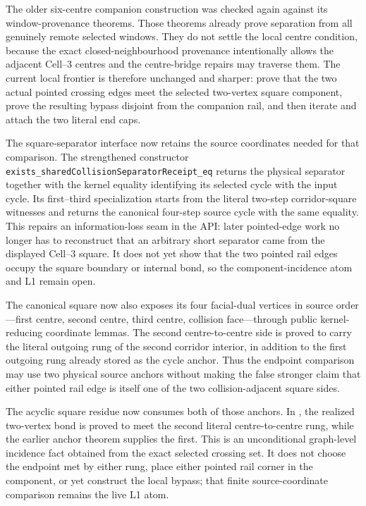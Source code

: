 \documentclass[11pt]{article}
\theoremstyle{definition}
\begin{document}
The older six-centre companion construction was checked again against its
window-provenance theorems.  Those theorems already prove separation from all
genuinely remote selected windows.  They do not settle the local centre
condition, because the exact closed-neighbourhood provenance intentionally
allows the adjacent Cell--3 centres and the centre-bridge repairs may traverse
them.  The current local frontier is therefore unchanged and sharper: prove
that the two actual pointed crossing edges meet the selected two-vertex square
component, prove the resulting bypass disjoint from the companion rail, and
then iterate and attach the two literal end caps.

The square-separator interface now retains the source coordinates needed for
that comparison.  The strengthened constructor
\texttt{exists\_sharedCollisionSeparatorReceipt\_eq} returns the physical
separator together with the kernel equality identifying its selected cycle
with the input cycle.  Its first--third specialization starts from the literal
two-step corridor-square witnesses and returns the canonical four-step source
cycle with the same equality.  This repairs an information-loss seam in the
API: later pointed-edge work no longer has to reconstruct that an arbitrary
short separator came from the displayed Cell--3 square.  It does not yet show
that the two pointed rail edges occupy the square boundary or internal bond,
so the component-incidence atom and L1 remain open.

The canonical square now also exposes its four facial-dual vertices in source
order---first centre, second centre, third centre, collision face---through
public kernel-reducing coordinate lemmas.  The second centre-to-centre side is
proved to carry the literal outgoing rung of the second corridor interior, in
addition to the first outgoing rung already stored as the cycle anchor.  Thus
the endpoint comparison may use two physical source anchors without making
the false stronger claim that either pointed rail edge is itself one of the
two collision-adjacent square sides.

The acyclic square residue now consumes both of those anchors.  In
,
the realized two-vertex bond is proved to meet the second literal
centre-to-centre rung, while the earlier anchor theorem supplies the first.
This is an unconditional graph-level incidence fact obtained from the exact
selected crossing set.  It does not choose the endpoint met by either rung,
place either pointed rail corner in the component, or yet construct the local
bypass; that finite source-coordinate comparison remains the live L1 atom.
\end{document}
